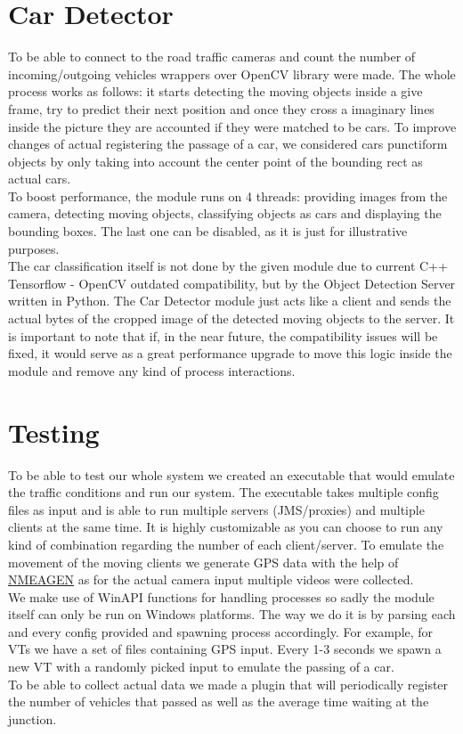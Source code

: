 \documentclass[17pt]{report}
\begin{document}
\pagebreak
\section{Car Detector}
\indent \indent
To be able to connect to the road traffic cameras and count the number of 
incoming/outgoing vehicles wrappers over OpenCV library were made. The whole process 
works as follows: it starts detecting the moving objects inside a give frame, try to 
predict their next position and once they cross a imaginary lines inside the picture
they are accounted if they were matched to be cars. To improve changes 
of actual registering the passage of a car, we considered cars 
punctiform objects by only taking into account the center point of the 
bounding rect as actual cars. \\
\indent
To boost performance, the module runs on 4 threads: providing images
from the camera, detecting moving objects, classifying objects as
cars and displaying the bounding boxes. The last one can be disabled,
as it is just for illustrative purposes. \\
\indent 
The car classification itself is 
not done by the given module due to current C++ Tensorflow - OpenCV outdated compatibility,
but by the Object Detection Server written in Python. The Car Detector module just acts 
like a client and sends the actual bytes of the cropped image of the detected moving objects 
to the server. It is important to note that if, in the near future, the compatibility issues
will be fixed, it would serve as a great performance upgrade to move this logic
inside the module and remove any kind of process interactions.

\section{Testing}
\indent \indent
To be able to test our whole system we created an executable that 
would emulate the traffic conditions and run our system. The executable 
takes multiple config files as input and is able to run multiple 
servers (JMS/proxies) and multiple clients at the same time. It is 
highly customizable as you can choose to run any kind of combination 
regarding the number of each client/server. To emulate the movement of 
the moving clients we generate GPS data with the help of 
\href{https://www.nmeagen.org/}{NMEAGEN} as for the actual camera input 
multiple videos were collected.  \\
\indent
We make use of WinAPI functions for handling processes so sadly the 
module itself can only be run on Windows platforms. The way we do it 
is by parsing each and every config provided and spawning process 
accordingly. For example, for VTs we have a set of files containing 
GPS input. Every 1-3 seconds we spawn a new VT with a randomly
picked input to emulate the passing of a car.\\
\indent
To be able to collect actual data we made a plugin that will 
periodically register the number of vehicles that passed as well as 
the average time waiting at the junction.
\end{document}
